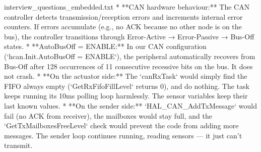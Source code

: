 \begin{filecontents*}{interview_questions_embedded.txt}
* **CAN hardware behaviour:** The CAN controller detects transmission/reception errors and increments internal error counters. If errors accumulate (e.g., no ACK because no other node is on the bus), the controller transitions through Error-Active → Error-Passive → Bus-Off states.
* **AutoBusOff = ENABLE:** In our CAN configuration (`hcan.Init.AutoBusOff = ENABLE`), the peripheral automatically recovers from Bus-Off after 128 occurrences of 11 consecutive recessive bits on the bus. It does not crash.
* **On the actuator side:** The `canRxTask` would simply find the FIFO always empty (`GetRxFifoFillLevel` returns 0), and do nothing. The task keeps running its 10ms polling loop harmlessly. The sensor variables keep their last known values.
* **On the sender side:** `HAL_CAN_AddTxMessage` would fail (no ACK from receiver), the mailboxes would stay full, and the `GetTxMailboxesFreeLevel` check would prevent the code from adding more messages. The sender loop continues running, reading sensors — it just can't transmit.
\end{filecontents*}
\documentclass[11pt,a4paper]{article}

\usepackage[margin=2.2cm]{geometry}
\usepackage[T1]{fontenc}
\usepackage[utf8]{inputenc}
\usepackage{titlesec}
\usepackage{xcolor}
\usepackage{fancyhdr}
\usepackage{hyperref}
\usepackage{parskip}
\usepackage{fancyvrb}
\usepackage{tcolorbox}


\pagestyle{fancy}
\fancyhf{}
\renewcommand{\headrulewidth}{0.4pt}

\titleformat{\section}{\Large\bfseries\color{accentblue}}{}{0em}{}[\vspace{-0.5em}\rule{\textwidth}{0.4pt}]
\titleformat{\subsection}{\large\bfseries\color{accentblue}}{}{0em}{}

[1][]{
  colback=blue!5,
  colframe=accentblue,
  fonttitle=\bfseries,
  title={#1},
  arc=2pt,
  boxrule=0.5pt
}



\begin{center}
  \vspace*{1.2cm}
  {\Huge\bfseries\color{accentblue} Interview Questions Reference}\\[1em]
  {\Large STM32 CAN Bus + FreeRTOS Environmental Monitor}\\[1em]
  {\large Standalone LaTeX version with embedded content}\\[1.5em]
  \rule{0.8\textwidth}{0.4pt}
\end{center}

